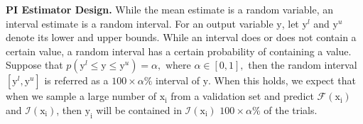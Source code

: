 \documentclass[letterpaper]{article} %
\begin{document}
\noindent \textbf{PI Estimator Design.} While the mean estimate is a random variable, an interval estimate is a random interval. For an output variable $\mathrm{y}$, let $\mathrm{y}^l$ and $\mathrm{y}^u$ denote its lower and upper bounds. While an interval does or does not contain a certain value, a random interval has a certain probability of containing a value. Suppose that $p(\mathrm{y}^l \leq \mathrm{y} \leq \mathrm{y}^u)= \alpha, \text{ where } \alpha \in [0, 1],$ then the random interval $[\mathrm{y}^l, \mathrm{y}^u]$ is referred as a $100\times \alpha\%$ interval of $\mathrm{y}$. When this holds, we expect that when we sample a large number of $\mathrm{x_i}$ from a validation set and predict $\mathcal{F}(\mathrm{x_i})$ and $\mathcal{I}(\mathrm{x_i})$, then $\mathrm{y_i}$ will be contained in $\mathcal{I}(\mathrm{x_i})$ $100\times \alpha\%$ of the trials.
\end{document}
